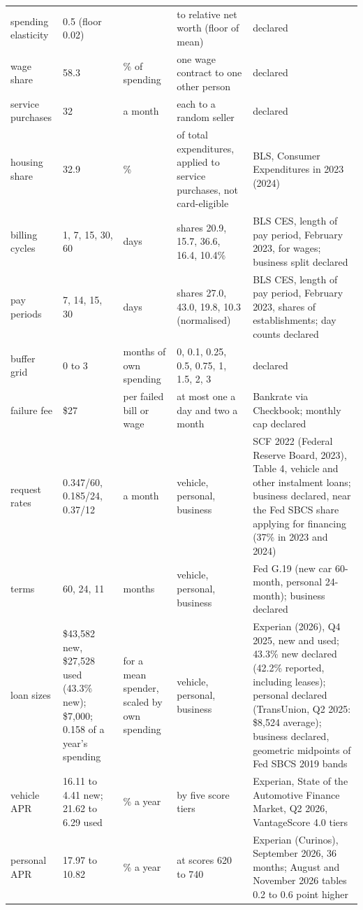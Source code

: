 {\begin{longtable}{@{}p{}p{}p{}p{}p{}@{}}
spending elasticity & 0.5 (floor 0.02) & & to relative net worth (floor of mean) & declared \\
wage share & 58.3 & \% of spending & one wage contract to one other person & declared \\
service purchases & 32 & a month & each to a random seller & declared \\
housing share & 32.9 & \% & of total expenditures, applied to service purchases, not card-eligible & BLS, Consumer Expenditures in 2023 (2024) \\
billing cycles & 1, 7, 15, 30, 60 & days & shares 20.9, 15.7, 36.6, 16.4, 10.4\% & BLS CES, length of pay period, February 2023, for wages; business split declared \\
pay periods & 7, 14, 15, 30 & days & shares 27.0, 43.0, 19.8, 10.3 (normalised) & BLS CES, length of pay period, February 2023, shares of establishments; day counts declared \\
buffer grid & 0 to 3 & months of own spending & 0, 0.1, 0.25, 0.5, 0.75, 1, 1.5, 2, 3 & declared \\
failure fee & \$27 & per failed bill or wage & at most one a day and two a month & Bankrate via Checkbook; monthly cap declared \\
request rates & 0.347/60, 0.185/24, 0.37/12 & a month & vehicle, personal, business & SCF 2022 (Federal Reserve Board, 2023), Table 4, vehicle and other instalment loans; business declared, near the Fed SBCS share applying for financing (37\% in 2023 and 2024) \\
terms & 60, 24, 11 & months & vehicle, personal, business & Fed G.19 (new car 60-month, personal 24-month); business declared \\
loan sizes & \$43,582 new, \$27,528 used (43.3\% new); \$7,000; 0.158 of a year's spending & for a mean spender, scaled by own spending & vehicle, personal, business & Experian (2026), Q4 2025, new and used; 43.3\% new declared (42.2\% reported, including leases); personal declared (TransUnion, Q2 2025: \$8,524 average); business declared, geometric midpoints of Fed SBCS 2019 bands \\
vehicle APR & 16.11 to 4.41 new; 21.62 to 6.29 used & \% a year & by five score tiers & Experian, State of the Automotive Finance Market, Q2 2026, VantageScore 4.0 tiers \\
personal APR & 17.97 to 10.82 & \% a year & at scores 620 to 740 & Experian (Curinos), September 2026, 36 months; August and November 2026 tables 0.2 to 0.6 point higher \\

\end{longtable}}

